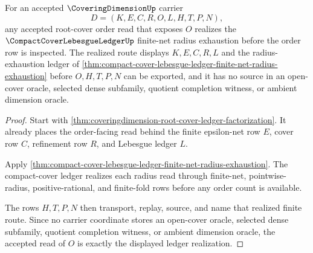\begin{theorem}
\label{thm:coveringdimension-root-cover-ledger-realization}
For an accepted $\CoveringDimensionUp$ carrier
$$
D=(K,E,C,R,O,L,H,T,P,N),
$$
any accepted root-cover order read that exposes $O$ realizes the $\CompactCoverLebesgueLedgerUp$ finite-net radius exhaustion before the order row is inspected. The realized route displays $K,E,C,R,L$ and the radius-exhaustion ledger of \autoref{thm:compact-cover-lebesgue-ledger-finite-net-radius-exhaustion} before $O,H,T,P,N$ can be exported, and it has no source in an open-cover oracle, selected dense subfamily, quotient completion witness, or ambient dimension oracle.
\end{theorem}
\begin{proof}
Start with \autoref{thm:coveringdimension-root-cover-ledger-factorization}. It already places the order-facing read behind the finite epsilon-net row $E$, cover row $C$, refinement row $R$, and Lebesgue ledger $L$.

Apply \autoref{thm:compact-cover-lebesgue-ledger-finite-net-radius-exhaustion}. The compact-cover ledger realizes each radius read through finite-net, pointwise-radius, positive-rational, and finite-fold rows before any order count is available.

The rows $H,T,P,N$ then transport, replay, source, and name that realized finite route. Since no carrier coordinate stores an open-cover oracle, selected dense subfamily, quotient completion witness, or ambient dimension oracle, the accepted read of $O$ is exactly the displayed ledger realization.
\end{proof}

